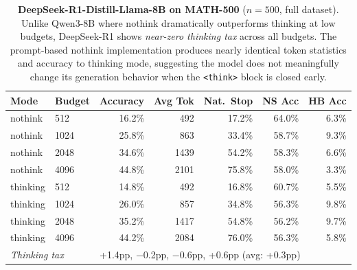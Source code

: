 \begin{table}[ht]
\centering
\small
\caption{\textbf{DeepSeek-R1-Distill-Llama-8B on MATH-500} ($n{=}500$, full dataset).
  Unlike Qwen3-8B where nothink dramatically outperforms thinking at low budgets,
  DeepSeek-R1 shows \emph{near-zero thinking tax} across all budgets.
  The prompt-based nothink implementation produces nearly identical token statistics
  and accuracy to thinking mode, suggesting the model does not meaningfully
  change its generation behavior when the \texttt{<think>} block is closed early.}
\label{tab:deepseek-math500}
\begin{tabular}{llrrrrr}
\toprule
\textbf{Mode} & \textbf{Budget} & \textbf{Accuracy} & \textbf{Avg Tok} & \textbf{Nat.\ Stop} & \textbf{NS Acc} & \textbf{HB Acc} \\
\midrule
nothink & 512  & 16.2\% & 492  & 17.2\% & 64.0\% & 6.3\% \\
nothink & 1024 & 25.8\% & 863  & 33.4\% & 58.7\% & 9.3\% \\
nothink & 2048 & 34.6\% & 1439 & 54.2\% & 58.3\% & 6.6\% \\
nothink & 4096 & 44.8\% & 2101 & 75.8\% & 58.0\% & 3.3\% \\
\midrule
thinking & 512  & 14.8\% & 492  & 16.8\% & 60.7\% & 5.5\% \\
thinking & 1024 & 26.0\% & 857  & 34.8\% & 56.3\% & 9.8\% \\
thinking & 2048 & 35.2\% & 1417 & 54.8\% & 56.2\% & 9.7\% \\
thinking & 4096 & 44.2\% & 2084 & 76.0\% & 56.3\% & 5.8\% \\
\midrule
\multicolumn{2}{l}{\textit{Thinking tax}} & \multicolumn{5}{l}{+1.4pp, $-$0.2pp, $-$0.6pp, +0.6pp (avg: +0.3pp)} \\
\bottomrule
\end{tabular}
\end{table}

